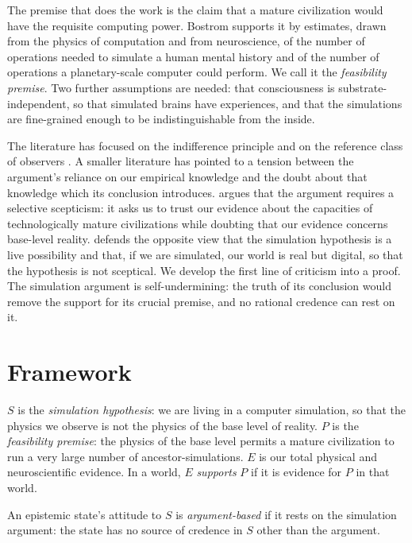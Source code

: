\documentclass{situationist-preprint}
\begin{document}
The premise that does the work is the claim that a mature civilization would have the requisite computing power. Bostrom supports it by estimates, drawn from the physics of computation and from neuroscience, of the number of operations needed to simulate a human mental history and of the number of operations a planetary-scale computer could perform. We call it the \emph{feasibility premise}. Two further assumptions are needed: that consciousness is substrate-independent, so that simulated brains have experiences, and that the simulations are fine-grained enough to be indistinguishable from the inside.

The literature has focused on the indifference principle \citep{Weatherson2003,Bostrom2005} and on the reference class of observers \citep{BostromKulczycki2011}. A smaller literature has pointed to a tension between the argument's reliance on our empirical knowledge and the doubt about that knowledge which its conclusion introduces. \citet{Birch2013} argues that the argument requires a selective scepticism: it asks us to trust our evidence about the capacities of technologically mature civilizations while doubting that our evidence concerns base-level reality. \citet{Chalmers2022} defends the opposite view that the simulation hypothesis is a live possibility and that, if we are simulated, our world is real but digital, so that the hypothesis is not sceptical. We develop the first line of criticism into a proof. The simulation argument is self-undermining: the truth of its conclusion would remove the support for its crucial premise, and no rational credence can rest on it.

\section{Framework}

\begin{definition}[Hypotheses]\label{d:hyp}
$S$ is the \emph{simulation hypothesis}: we are living in a computer simulation, so that the physics we observe is not the physics of the base level of reality. $P$ is the \emph{feasibility premise}: the physics of the base level permits a mature civilization to run a very large number of ancestor-simulations. $E$ is our total physical and neuroscientific evidence. In a world, $E$ \emph{supports} $P$ if it is evidence for $P$ in that world.
\end{definition}

\begin{definition}\label{d:viaarg}
An epistemic state's attitude to $S$ is \emph{argument-based} if it rests on the simulation argument: the state has no source of credence in $S$ other than the argument.
\end{definition}
\end{document}
